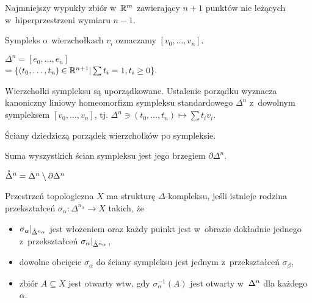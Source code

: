 

 


\begin{definicja}[$n$-sympleks]
	Najmniejszy wypukły zbiór w~${\mathbb{R}}^m$ zawierający $n+1$ punktów nie leżących 
	w~hiperprzestrzeni wymiaru $n-1$.
	
	Sympleks o~wierzchołkach $v_i$ oznaczamy $[v_0, \ldots, v_n]$.
\end{definicja}

\begin{definicja} 
	$\Delta^n = [e_0, \ldots, e_n] $\\
	$= \{ (t_0, \ldots, t_n) \in {\mathbb{R}}^{n+1} | \sum t_i = 1, t_i \geq 0 \}$.
\end{definicja}

\begin{uwaga}
	Wierzchołki sympleksu są uporządkowane. 
	Ustalenie porządku wyznacza kanoniczny liniowy homeomorfizm
	sympleksu standardowego $\Delta^n$ z~dowolnym sympleksem
	$[v_0, \ldots, v_n]$,
	tj. $\Delta^n \owns (t_0, \ldots, t_n) \mapsto \sum t_i v_i$.
\end{uwaga}

\begin{uwaga}
	Ściany dziedziczą porządek wierzchołków po sympleksie.
\end{uwaga}

\begin{definicja}
	Suma wyszystkich ścian sympleksu jest jego brzegiem $\partial \Delta^n$.
\end{definicja}

\begin{definicja}
	${\mathring{\Delta}^{n}} = {\Delta^{n}} \setminus \partial {\Delta^{n}}$
\end{definicja}

\begin{definicja}
	Przestrzeń topologiczna $X$ ma strukturę $\Delta$-kompleksu, 
	jeśli istnieje rodzina przekształceń $\sigma_\alpha: \Delta^{n_\alpha} \to X$
	takich, że
	\begin{itemize}
 		\item $\sigma_\alpha |_{\mathring{\Delta}^{n_\alpha}}$ jest włożeniem
 		oraz każdy puinkt jest w~obrazie dokładnie jednego
 		z~przekształceń $\sigma_\alpha |_{\mathring{\Delta}^{n_\alpha}}$,
 		\item dowolne obcięcie $\sigma_\alpha$ do ściany sympleksu 
 		jest jednym z~przekształceń $\sigma_\beta$,
 		\item zbiór $A \subseteq X$ jest otwarty wtw, gdy
 		$\sigma_\alpha^{-1}(A)$ jest otwarty w~${\Delta^{n}}$ dla każdego
 		$\alpha$.
	\end{itemize}

\end{definicja}

